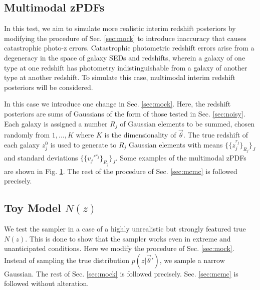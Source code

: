 \documentclass[preprint]{aastex}
\begin{document}

\clearpage
\subsection{Multimodal zPDFs}
\label{sec:multi}

In this test, we aim to simulate more realistic interim redshift posteriors by 
modifying the procedure of Sec. \ref{sec:mock} to introduce inaccuracy that 
causes catastrophic photo-z errors.  Catastrophic photometric redshift errors 
arise from a degeneracy in the space of galaxy SEDs and redshifts, wherein a 
galaxy of one type at one redshift has photometry indistinguishable from a 
galaxy of another type at another redshift.  To simulate this case, multimodal 
interim redshift posteriors will be considered.

In this case we introduce one change in Sec. \ref{sec:mock}.  Here, the 
redshift posteriors are sums of Gaussians of the form of those tested in Sec. 
\ref{sec:noisy}.  Each galaxy is assigned a number $R_{j}$ of Gaussian elements 
to be summed, chosen randomly from $1,\dots,K$ where $K$ is the dimensionality 
of $\vec{\theta}$.  The true redshift of each galaxy $z_{j}^{0}$ is used to 
generate to $R_{j}$ Gaussian elements with means 
$\{\{z_{j}^{r_{j}}\}_{R_{j}}\}_{J}$ and standard deviations 
$\{\{v_{j}'^{r_{j}}\}_{R_{j}}\}_{J}$.  Some examples of the multimodal zPDFs 
are shown in Fig. \ref{fig:multipzs}.  The rest of the procedure of Sec. 
\ref{sec:mcmc} is followed precisely.

\begin{figure}
\caption{}
\label{fig:multipzs}
\end{figure}


\clearpage
\subsection{Toy Model $N(z)$}
\label{sec:fake}

We test the sampler in a case of a highly unrealistic but strongly featured 
true $N(z)$.  This is done to show that the sampler works even in extreme and 
unanticipated conditions.  Here we modify the procedure of Sec. \ref{sec:mock}. 
 Instead of sampling the true distribution $p(z|\vec{\theta}')$, we sample a 
narrow Gaussian.  The rest of Sec. \ref{sec:mock} is followed precisely.  Sec. 
\ref{sec:mcmc} is followed without alteration.
\end{document}
